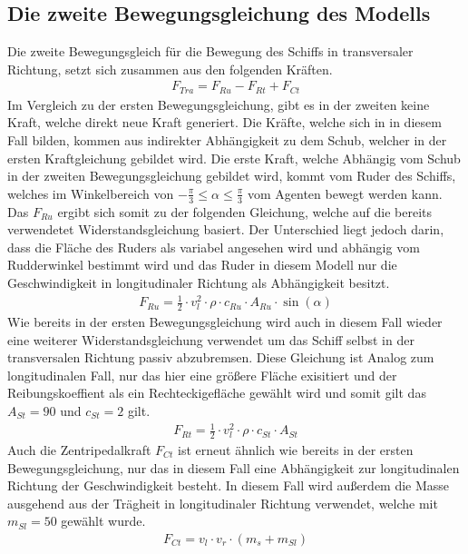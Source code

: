 \documentclass[]{iat}
\begin{document}
\subsection{Die zweite Bewegungsgleichung des Modells} \label{sec:eom2}
Die zweite Bewegungsgleich für die Bewegung des Schiffs in transversaler Richtung, setzt sich zusammen aus den folgenden Kräften.
\begin{align}
    F_{Tra} = F_{Ru} - F_{Rt} + F_{Ct}
\end{align}
Im Vergleich zu der ersten Bewegungsgleichung, gibt es in der zweiten keine Kraft, welche direkt neue Kraft generiert. Die Kräfte, welche sich in in diesem Fall bilden, kommen aus indirekter Abhängigkeit zu dem Schub, welcher in der ersten Kraftgleichung gebildet wird. Die erste Kraft, welche Abhängig vom Schub in der zweiten Bewegungsgleichung gebildet wird, kommt vom Ruder des Schiffs, welches im Winkelbereich von $-\frac{\pi}{3} \leq \alpha \leq \frac{\pi}{3}$ vom Agenten bewegt werden kann. Das $F_{Ru}$ ergibt sich somit zu der folgenden Gleichung, welche auf die bereits verwendetet Widerstandsgleichung basiert. Der Unterschied liegt jedoch darin, dass die Fläche des Ruders als variabel angesehen wird und abhängig vom Rudderwinkel bestimmt wird und das Ruder in diesem Modell nur die Geschwindigkeit in longitudinaler Richtung als Abhängigkeit besitzt.
\begin{align}
    F_{Ru} = \frac{1}{2} \cdot v_l^2 \cdot \rho \cdot c_{Ru} \cdot A_{Ru} \cdot \sin(\alpha) \label{eq:rudder_resistance_long}
\end{align}
Wie bereits in der ersten Bewegungsgleichung wird auch in diesem Fall wieder eine weiterer Widerstandsgleichung verwendet um das Schiff selbst in der transversalen Richtung passiv abzubremsen. Diese Gleichung ist Analog zum longitudinalen Fall, nur das hier eine größere Fläche exisitiert und der Reibungskoeffient als ein Rechteckigefläche gewählt wird und somit gilt das $A_{St} = 90$ und $c_{St} = 2$ gilt.
\begin{align}
    F_{Rt} = \frac{1}{2} \cdot v_l^2 \cdot \rho \cdot c_{St} \cdot A_{St} \label{eq:side_resistance}
\end{align}
Auch die Zentripedalkraft $F_{Ct}$ ist erneut ähnlich wie bereits in der ersten Bewegungsgleichung, nur das in diesem Fall eine Abhängigkeit zur longitudinalen Richtung der Geschwindigkeit besteht. In diesem Fall wird außerdem die Masse ausgehend aus der Trägheit in longitudinaler Richtung verwendet, welche mit $m_{Sl} = 50$ gewählt wurde.
\begin{align}
    F_{Ct} = v_l \cdot v_r \cdot (m_{s}+ m_{Sl})
\end{align}
\end{document}
